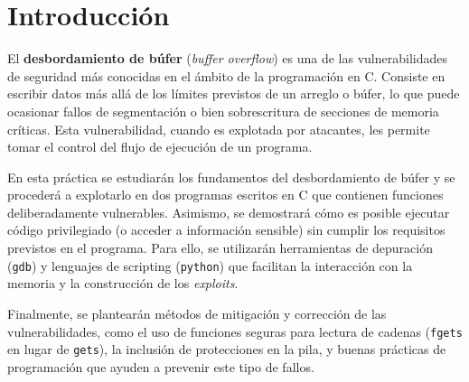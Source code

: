 \section{Introducción}
El \textbf{desbordamiento de búfer} (\emph{buffer overflow}) es una de las vulnerabilidades de seguridad
más conocidas en el ámbito de la programación en C. Consiste en escribir datos más allá de los
límites previstos de un arreglo o búfer, lo que puede ocasionar fallos de segmentación o bien
sobrescritura de secciones de memoria críticas. Esta vulnerabilidad, cuando es explotada por
atacantes, les permite tomar el control del flujo de ejecución de un programa.

En esta práctica se estudiarán los fundamentos del desbordamiento de búfer y se procederá a
explotarlo en dos programas escritos en C que contienen funciones deliberadamente vulnerables.
Asimismo, se demostrará cómo es posible ejecutar código privilegiado (o acceder a información
sensible) sin cumplir los requisitos previstos en el programa. Para ello, se utilizarán herramientas
de depuración (\texttt{gdb}) y lenguajes de scripting (\texttt{python}) que facilitan la interacción
con la memoria y la construcción de los \emph{exploits}.

Finalmente, se plantearán métodos de mitigación y corrección de las vulnerabilidades, como el
uso de funciones seguras para lectura de cadenas (\texttt{fgets} en lugar de \texttt{gets}), la
inclusión de protecciones en la pila, y buenas prácticas de programación que ayuden a prevenir
este tipo de fallos.

\vspace{1em}
